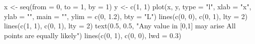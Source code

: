 \begin{Schunk}
\begin{Sinput}
 x <- seq(from = 0, to = 1, by = 1)
 y <- c(1, 1)
 plot(x, y, type = "l", xlab = "x", ylab = "", main = "", ylim = c(0, 1.2), bty = "L")
 lines(c(0, 0), c(0, 1), lty = 2)
 lines(c(1, 1), c(0, 1), lty = 2)
 text(0.5, 0.5, "Any value in [0,1] may arise \n All points are equally likely")
 lines(c(0, 1), c(0, 0), lwd = 0.3)
\end{Sinput}
\end{Schunk}
